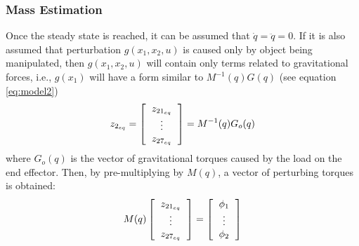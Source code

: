 \documentclass[9pt,spanish,aspectratio=1610]{beamer}
\begin{document}
\begin{frame}\frametitle{Mass Estimation}
  Once the steady state is reached, it can be assumed that $\dot{q} = \ddot{q} = 0$. If it is also assumed that perturbation $g(x_1, x_2, u)$ is caused only by object being manipulated, then $g(x_1, x_2, u)$ will contain only terms related to gravitational forces, i.e., $g(x_1)$ will have a form similar to $M^{-1}(q)G(q)$ (see equation \ref{eq:model2})
  \[
    z_{2_{eq}} = \left[\begin{tabular}{c}
      $z_{21_{eq}}$\\
      $\vdots$\\
      $z_{27_{eq}}$
    \end{tabular}\right] = M^{-1}(q)G_o(q)
\]
where $G_o(q)$ is the vector of gravitational torques caused by the load on the end effector. Then, by pre-multiplying by $M(q)$, a vector of perturbing torques is obtained:
\begin{equation}
  M(q)\left[\begin{tabular}{c}
      $z_{21_{eq}}$\\
      $\vdots$\\
      $z_{27_{eq}}$
    \end{tabular}\right] =
   \left[\begin{tabular}{c}
       $\phi_1$\\
       $\vdots$\\
       $\phi_2$
     \end{tabular}\right]
   \label{eq:Mqz}
\end{equation}
\end{frame}
\end{document}
